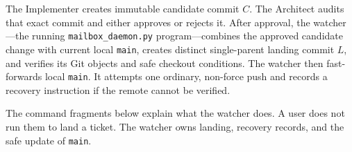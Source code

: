 \documentclass[10pt,twocolumn]{article}
\newcommand{\code}[1]{\texttt{#1}}
\begin{document}

\begin{summarybox}
The Implementer creates immutable candidate commit $C$. The Architect audits
that exact commit and either approves or rejects it. After approval, the
watcher---the running \code{mailbox\_daemon.py} program---combines the approved
candidate change with current local \code{main}, creates distinct
single-parent landing commit $L$, and verifies its Git objects and safe
checkout conditions. The watcher then fast-forwards local \code{main}. It
attempts one ordinary, non-force push and records a recovery instruction if
the remote cannot be verified.
\end{summarybox}

\begin{warningbox}
The command fragments below explain what the watcher does. A user does not
run them to land a ticket. The watcher owns landing, recovery records, and the
safe update of \code{main}.
\end{warningbox}
\end{document}
